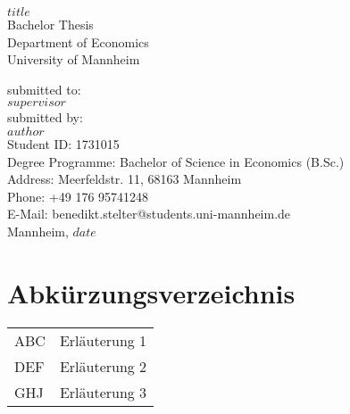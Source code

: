 \documentclass{scrbook}
\begin{document}
	
\frontmatter
\begin{titlepage}

\begin{center}

\vspace*{1,2cm}

\huge {\bfseries $title$}\\[1.8cm]

\Large {Bachelor Thesis}\\[1cm]

\large {Department of Economics}\\[0.2cm]

\large {University of Mannheim}\\[0.5cm]

\end{center}

\vfill

\noindent submitted to:\\
$supervisor$\\[1cm]
submitted by:\\
$author$\\[1cm]
Student ID: 1731015\\
Degree Programme: Bachelor of Science in Economics (B.Sc.)\\[1cm]
Address: Meerfeldstr. 11, 68163 Mannheim\\
Phone: +49 176 95741248\\
E-Mail: benedikt.stelter@students.uni-mannheim.de\\[1cm]
Mannheim, $date$

\setcounter{page}{0}

\end{titlepage}

  \tableofcontents

\chapter*{Abkürzungsverzeichnis}\label{av}
\begin{tabular}{ll}
ABC & Erläuterung 1 \\
DEF & Erläuterung 2\\
GHJ & Erläuterung 3\\
\end{tabular}

\listoffigures
\end{document}
